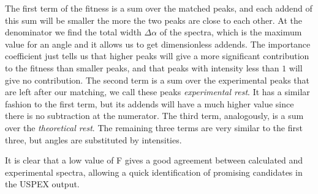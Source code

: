 \documentclass{article}
\begin{document}
The first term of the fitness is a sum over the matched peaks, and each addend of this sum will be smaller the more the two peaks are close to each other. At the denominator we find the total width $\Delta \alpha$ of the spectra, which is the maximum value for an angle and it allows us to get dimensionless addends. The importance coefficient just tells us that higher peaks will give a more significant contribution to the fitness than smaller peaks, and that peaks with intensity less than $1$ will give no contribution. The second term is a sum over the experimental peaks that are left after our matching, we call these peaks \emph{experimental rest}. It has a similar fashion to the first term, but its addends will have a much higher value since there is no subtraction at the numerator. The third term, analogously, is a sum over the \emph{theoretical rest}. The remaining three terms are very similar to the first three, but angles are substituted by intensities.

It is clear that a low value of F gives a good agreement between calculated and experimental spectra, allowing a quick identification of promising candidates in the USPEX output.
\end{document}
